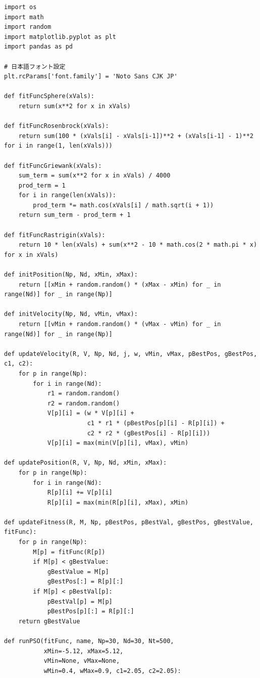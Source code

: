 \begin{lstlisting}[caption=PSOによるベンチマーク関数の最適化, label=lst:pso_code]
import os
import math
import random
import matplotlib.pyplot as plt
import pandas as pd

# 日本語フォント設定
plt.rcParams['font.family'] = 'Noto Sans CJK JP'

def fitFuncSphere(xVals):
    return sum(x**2 for x in xVals)

def fitFuncRosenbrock(xVals):
    return sum(100 * (xVals[i] - xVals[i-1])**2 + (xVals[i-1] - 1)**2 for i in range(1, len(xVals)))

def fitFuncGriewank(xVals):
    sum_term = sum(x**2 for x in xVals) / 4000
    prod_term = 1
    for i in range(len(xVals)):
        prod_term *= math.cos(xVals[i] / math.sqrt(i + 1))
    return sum_term - prod_term + 1

def fitFuncRastrigin(xVals):
    return 10 * len(xVals) + sum(x**2 - 10 * math.cos(2 * math.pi * x) for x in xVals)

def initPosition(Np, Nd, xMin, xMax):
    return [[xMin + random.random() * (xMax - xMin) for _ in range(Nd)] for _ in range(Np)]

def initVelocity(Np, Nd, vMin, vMax):
    return [[vMin + random.random() * (vMax - vMin) for _ in range(Nd)] for _ in range(Np)]

def updateVelocity(R, V, Np, Nd, j, w, vMin, vMax, pBestPos, gBestPos, c1, c2):
    for p in range(Np):
        for i in range(Nd):
            r1 = random.random()
            r2 = random.random()
            V[p][i] = (w * V[p][i] +
                       c1 * r1 * (pBestPos[p][i] - R[p][i]) +
                       c2 * r2 * (gBestPos[i] - R[p][i]))
            V[p][i] = max(min(V[p][i], vMax), vMin)

def updatePosition(R, V, Np, Nd, xMin, xMax):
    for p in range(Np):
        for i in range(Nd):
            R[p][i] += V[p][i]
            R[p][i] = max(min(R[p][i], xMax), xMin)

def updateFitness(R, M, Np, pBestPos, pBestVal, gBestPos, gBestValue, fitFunc):
    for p in range(Np):
        M[p] = fitFunc(R[p])
        if M[p] < gBestValue:
            gBestValue = M[p]
            gBestPos[:] = R[p][:]
        if M[p] < pBestVal[p]:
            pBestVal[p] = M[p]
            pBestPos[p][:] = R[p][:]
    return gBestValue

def runPSO(fitFunc, name, Np=30, Nd=30, Nt=500,
           xMin=-5.12, xMax=5.12,
           vMin=None, vMax=None,
           wMin=0.4, wMax=0.9, c1=2.05, c2=2.05):


\end{lstlisting}
